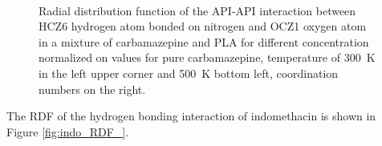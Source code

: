 \begin{figure}[htb!]
	\centering
	\\
	\caption{Radial distribution function of the API-API interaction between HCZ6 hydrogen atom bonded on nitrogen and OCZ1 oxygen atom in a mixture of carbamazepine and PLA for different concentration normalized on values for pure carbamazepine, temperature of 300~K in the left upper corner and 500~K bottom left, coordination numbers on the right.}
	\label{fig:cbz_RDF_}
\end{figure}

The RDF of the hydrogen bonding interaction of indomethacin is shown in Figure \ref{fig:indo_RDF_}.

